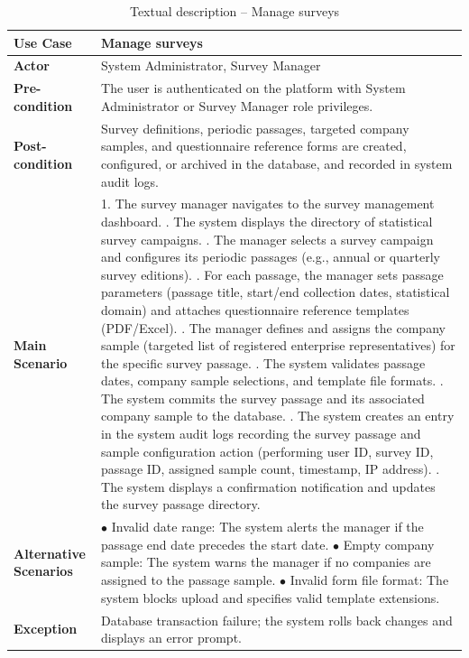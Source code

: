\documentclass[12pt,a4paper]{report}
\begin{document}
\begin{table}[H]
\centering
\caption{Textual description -- Manage surveys}
\label{tab:refinement_manage_surveys}
\vspace{0.2cm}
\small
\renewcommand{\arraystretch}{1.15}
\begin{tabular}{|p{3.5cm}|p{12.0cm}|}
\hline
\textbf{Use Case} & Manage surveys \\ \hline
\textbf{Actor} & System Administrator, Survey Manager \\ \hline
\textbf{Pre-condition} & The user is authenticated on the platform with System Administrator or Survey Manager role privileges. \\ \hline
\textbf{Post-condition} & Survey definitions, periodic passages, targeted company samples, and questionnaire reference forms are created, configured, or archived in the database, and recorded in system audit logs. \\ \hline
\textbf{Main Scenario} & 
1. The survey manager navigates to the survey management dashboard. \newline
2. The system displays the directory of statistical survey campaigns. \newline
3. The manager selects a survey campaign and configures its periodic passages (e.g., annual or quarterly survey editions). \newline
4. For each passage, the manager sets passage parameters (passage title, start/end collection dates, statistical domain) and attaches questionnaire reference templates (PDF/Excel). \newline
5. The manager defines and assigns the company sample (targeted list of registered enterprise representatives) for the specific survey passage. \newline
6. The system validates passage dates, company sample selections, and template file formats. \newline
7. The system commits the survey passage and its associated company sample to the database. \newline
8. The system creates an entry in the system audit logs recording the survey passage and sample configuration action (performing user ID, survey ID, passage ID, assigned sample count, timestamp, IP address). \newline
9. The system displays a confirmation notification and updates the survey passage directory. \\ \hline
\textbf{Alternative Scenarios} & 
$\bullet$ Invalid date range: The system alerts the manager if the passage end date precedes the start date. \newline
$\bullet$ Empty company sample: The system warns the manager if no companies are assigned to the passage sample. \newline
$\bullet$ Invalid form file format: The system blocks upload and specifies valid template extensions. \\ \hline
\textbf{Exception} & Database transaction failure; the system rolls back changes and displays an error prompt. \\ \hline
\end{tabular}
\end{table}
\end{document}
